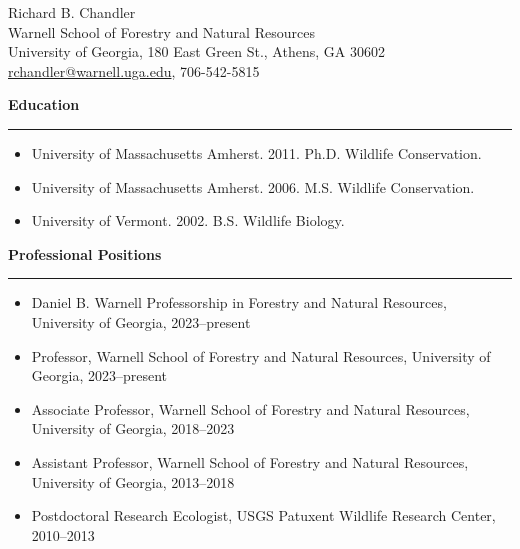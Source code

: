 \documentclass[12pt]{article}
\begin{document}
\flushleft

% 

\singlespacing
\thispagestyle{plain} %

\begin{center}
{\large Richard B. Chandler} \\
Warnell School of Forestry and Natural Resources \\ %
University of Georgia, %
180 East Green St., Athens, GA 30602 \\
\href{mailto:rchandler@warnell.uga.edu}{rchandler@warnell.uga.edu},  %
706-542-5815 \\
\end{center}


\vspace{0.8cm}

{\large \bf Education} \\
\rule[3mm]{\textwidth}{0.3mm}

\begin{itemize}
    \item \textnormal{University of Massachusetts Amherst}. 2011. Ph.D. Wildlife Conservation. 
    \item \textnormal{University of Massachusetts Amherst}. 2006. M.S. Wildlife Conservation. 
    \item \textnormal{University of Vermont}. 2002. B.S. Wildlife Biology. 
\end{itemize}


\vspace{0.5cm}

{\large \bf Professional Positions} \\
\rule[3mm]{\textwidth}{0.3mm}

\begin{itemize}

\item Daniel B. Warnell Professorship in Forestry and Natural
  Resources, University of Georgia, 2023--present 

\item \textnormal{Professor}, Warnell School of Forestry and
  Natural Resources, 
  University of Georgia, 2023--present

\item \textnormal{Associate Professor}, Warnell School of Forestry and
  Natural Resources, 
  University of Georgia, 2018--2023

\item \textnormal{Assistant Professor}, Warnell School of Forestry and
  Natural Resources, 
  University of Georgia, 2013--2018
  
\item \textnormal{Postdoctoral Research Ecologist}, USGS Patuxent
  Wildlife Research Center, 2010--2013

\end{itemize}
\end{document}
